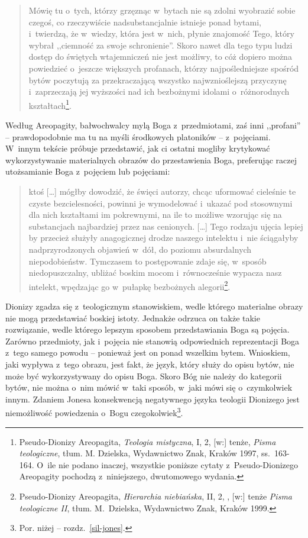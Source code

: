 \begin{quote}
Mówię tu o~tych, którzy grzęznąc w~bytach nie są zdolni wyobrazić sobie czegoś, co rzeczywiście nadsubstancjalnie istnieje ponad bytami, i~twierdzą, że w~wiedzy, która jest w~nich, płynie znajomość Tego, który wybrał ,,ciemność za swoje schronienie''. Skoro nawet dla tego typu ludzi dostęp do świętych wtajemniczeń nie jest możliwy, to cóż dopiero można powiedzieć o~jeszcze większych profanach, którzy najpośledniejsze spośród bytów poczytują za przekraczającą wszystko najwznioślejszą przyczynę i~zaprzeczają jej wyższości nad ich bezbożnymi idolami o~różnorodnych kształtach\footnote{Pseudo-Dionizy Areopagita, \textit{Teologia mistyczna}, I, 2, [w:] tenże, \textit{Pisma teologiczne}, tłum. M. Dzielska, Wydawnictwo Znak, Kraków 1997, ss.~163-164. O~ile nie podano inaczej, wszystkie poniższe cytaty z~Pseudo-Dionizego Areopagity pochodzą z~niniejszego, dwutomowego wydania.}.
\end{quote}

Według Areopagity, bałwochwalcy mylą Boga z~przedmiotami, zaś inni ,,profani'' -- prawdopodobnie ma tu na myśli środkowych platoników -- z~pojęciami. W~innym tekście próbuje przedstawić, jak ci ostatni mogliby krytykować wykorzystywanie materialnych obrazów do przestawienia Boga, preferując raczej utożsamianie Boga z~pojęciem lub pojęciami:

\begin{quote}
ktoś [\ldots] mógłby dowodzić, że święci autorzy, chcąc uformować cieleśnie te czyste bezcielesności, powinni je wymodelować i~ukazać pod stosownymi dla nich kształtami im pokrewnymi, na ile to możliwe wzorując się na substancjach najbardziej przez nas cenionych. [\ldots] Tego rodzaju ujęcia lepiej by przecież służyły anagogicznej drodze naszego intelektu i~nie ściągałyby nadprzyrodzonych objawień w~dół, do poziomu absurdalnych niepodobieństw. Tymczasem to postępowanie zdaje się, w~sposób niedopuszczalny, ubliżać boskim mocom i~równocześnie wypacza nasz intelekt, wpędzając go w~pułapkę bezbożnych alegorii\footnote{Pseudo-Dionizy Areopagita, \textit{Hierarchia niebiańska}, II, 2, , [w:] tenże  \textit{Pisma teologiczne II}, tłum. M.~Dzielska, Wydawnictwo Znak, Kraków 1999.}.
\end{quote}

Dionizy zgadza się z~teologicznym stanowiskiem, wedle którego materialne obrazy nie mogą przedstawiać boskiej istoty. Jednakże odrzuca on także takie rozwiązanie, wedle którego lepszym sposobem przedstawiania Boga są pojęcia. Zarówno przedmioty, jak i~pojęcia nie stanowią odpowiednich reprezentacji Boga z~tego samego powodu -- ponieważ jest on ponad wszelkim bytem. Wnioskiem, jaki wypływa z~tego obrazu, jest fakt, że język, który służy do opisu bytów, nie może być wykorzystywany do opisu Boga. Skoro Bóg nie należy do kategorii bytów, nie można o~nim mówić w~taki sposób, w~jaki mówi się o~czymkolwiek innym. Zdaniem Jonesa konsekwencją negatywnego języka teologii Dionizego jest niemożliwość powiedzenia o~Bogu czegokolwiek\footnote{Por. niżej -- rozdz.~\ref{sil-jones}.}.


